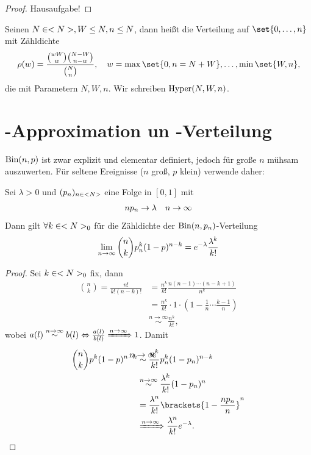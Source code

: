 \begin{proof}
	Hausaufgabe! %
\end{proof}

\begin{definition}
	Seinen $N \in <N>, W \le N, n \le N$, dann heißt die Verteilung auf $\set{0,\dots,n}$ mit Zähldichte
	\begin{align}
		\rho(w) = \frac{\binom{wW}{w}\binom{N-W}{n-w}}{\binom{N}{n}}, \quad w = \max\set{0,n=N+W}, \dots, \min\set{W,n},\notag
	\end{align}
	die  mit Parametern $N,W,n$. Wir schreiben $\operatorname{Hyper}(N,W,n)$.
\end{definition}

\section{-Approximation un -Verteilung}

$\operatorname{Bin}(n,p)$ ist zwar explizit und elementar definiert, jedoch für große $n$ mühsam auszuwerten. Für seltene Ereignisse ($n$ groß, $p$ klein) verwende daher:

\begin{proposition}
	Sei $\lambda > 0$ und $(p_n)_{n\in<N>}$ eine Folge in $[0,1]$ mit
	\begin{align}
		np_n \to \lambda \quad n \to \infty\notag
	\end{align}
	Dann gilt $\forall k \in <N>_0$ für die Zähldichte der $\operatorname{Bin}(n,p_n)$-Verteilung
	\begin{align}
		\lim_{n \to \infty} \binom{n}{k}p_n^k(1-p)^{n-k} = e^{-\lambda} \frac{\lambda^k}{k!}\notag
	\end{align}
\end{proposition}
\begin{proof}
	Sei $k \in <N>_{0}$ fix, dann
	\begin{align}
		\binom{n}{k} = \frac{n!}{k!(n-k)!} &= \frac{n^k}{k!}\frac{n(n-1)\cdots(n-k+1)}{n^k}\\
		&= \frac{n^k}{k!}\cdot 1 \cdot (1-\frac{1}{n}\cdots \frac{k-1}{n})\\
		&\overset{n \to \infty}{\sim} \frac{n^k}{k!},
	\end{align}
	wobei $a(l) \overset{n \to \infty}{\sim} b(l) \Leftrightarrow \frac{a(l)}{b(l)} \xRightarrow{n\to \infty} 1$. Damit
	\begin{align}
		\binom{n}{k}p^k (1-p)^{n-k} &\overset{\clap{$n \to \infty$}}{\sim} \frac{n^k}{k!}p_n^k(1-p_n)^{n-k}\\
		&\overset{n \to \infty}{\sim} \frac{\lambda^k}{k!}(1-p_n)^n\\
		&= \frac{\lambda^n}{k!}\brackets{1 - \frac{np_n}{n}}^n\\
		&\xRightarrow{n \to \infty} \frac{\lambda^n}{k!}e^{-\lambda}.
	\end{align}
\end{proof}

